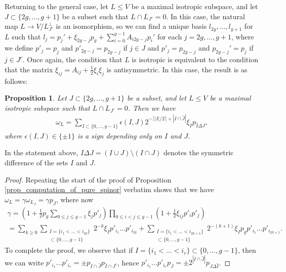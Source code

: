 \documentclass{article} %
\newtheorem{proposition}{Proposition}[section]
\numberwithin{equation}{section}
\begin{document}
Returning to the general case, let $L \leq V$ be a maximal isotropic subspace, and let $J \subset \{2g, \dots, g+1 \}$ be a subset such that $L \cap L_{J^c} = 0$. In this case, the natural map $L \to V / L_{J^c}^\perp$ is an isomorphism, so we can find a unique basis $l_{2g}, \dots, l_{g+1}$ for $L$ such that $l_j = p_j' + \xi_{2g-j} p_g + \sum_{i=0}^{g-1} A_{i 2g-j} p_i'$ for each $j = 2g, \dots, g+1$, where we define $p'_j = p_j$ and $p'_{2g-j} = p_{2g-j}$ if $j \in J$ and $p'_j = p_{2g-j}$ and $p_{2g-j}' = p_j$ if $j \in J^c$. Once again, the condition that $L$ is isotropic is equivalent to the condition that the matrix $\xi_{ij} = A_{ij} + \frac{1}{2} \xi_i \xi_j$ is antisymmetric. In this case, the result is as follows: 
\begin{proposition}\label{prop_computation_of_pure_spinor_nongeneric}
    Let $J \subset \{2g, \dots, g+1 \}$ be a subset, and let $L \leq V$ be a maximal isotropic subspace such that $L \cap L_{J^c} = 0$. Then we have 
    \begin{align}\label{eq_computation_purespinor_nongeneric}
     \omega_L = \sum_{I \subset \{ 0, \dots, g-1 \}} \epsilon(I, J) 2^{-\lceil |I| /2 \rceil + |I \cap \widehat{J}| } \xi_I p_{\widehat{I} \Delta J}, 
    \end{align}
    where $\epsilon(I, J) \in \{ \pm 1 \}$ is a sign depending only on $I$ and $J$.
\end{proposition}
In the statement above, $I \Delta J = (I\cup J)\setminus (I\cap J)$ denotes the symmetric difference of the sets $I$ and $J$.
\begin{proof}
    Repeating the start of the proof of Proposition \ref{prop_computation_of_pure_spinor} verbatim shows that we have $\omega_L = \gamma \omega_{L_J} = \gamma p_J$, where now
    \begin{multline*} \gamma = \left(1 +   \frac{1}{2} p_g \sum_{0 \leq j \leq g-1} \xi_j p'_j \right) \prod_{0 \leq i < j \leq g-1} \left(1 + \frac{1}{2} \xi_{ij} p'_i p'_j \right) \\ =  \sum_{k \geq 0} \sum_{\substack{I = \{i_1 < \dots < i_{2k}\} \\ \subset \{ 0, \dots, g-1 \}}} 2^{-k} \xi_I p'_{i_1} \dots p'_{i_{2k}} + \sum_{\substack{I = \{ i_1 < \dots < i_{2k+1} \} \\ \subset \{ 0, \dots, g-1 \}}} 2^{-(k+1)} \xi_I p_g p'_{i_1} \dots p'_{i_{2k+1}}. 
    \end{multline*}
    To complete the proof, we observe that if $I = \{ i_1 < \dots < i_r \} \subset \{ 0, \dots, g-1 \}$, then we can write $p'_{i_1} \dots p'_{i_r} = \pm p_{I \cap \widehat{J}} p_{\widehat{I} \cap J^c}$, hence $p'_{i_1} \dots p'_{i_r} p_J = \pm 2^{|I \cap \widehat{J} |} p_{J \Delta \widehat{I}}$. 
\end{proof}
\end{document}
